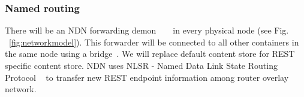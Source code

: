 \subsubsection{Named routing}

There will be an NDN forwarding demon ~\cite{NFD} ~\cite{zhang2014named} in every physical node (see Fig. ~\ref{fig:networkmodel}). This forwarder will be connected to all other containers in the same node using a bridge~\cite{DockerNet}. We will replace default content store for REST specific content store.
NDN uses NLSR - Named Data Link State Routing Protocol ~\cite{hoque2013nlsr} to transfer new REST endpoint information among router overlay network.


